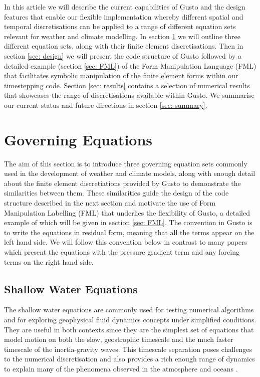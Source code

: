 \documentclass[journal abbreviation, manuscript]{copernicus}
\begin{document}
In this article we will describe the current capabilities of Gusto and
the design features that enable our flexible implementation whereby
different spatial and temporal discretisations can be applied to a
range of different equation sets relevant for weather and climate
modelling. In section \ref{sec: governing} we will outline three
different equation sets, along with their finite element
discretisations. Then in section \ref{sec: design} we will present the
code structure of Gusto followed by a detailed example (section
\ref{sec: FML}) of the Form Manipulation Language (FML) that facilitates
symbolic manipulation of the finite element forms within our
timestepping code. Section \ref{sec: results} contains a selection of
numerical results that showcases the range of discretisations
available within Gusto. We summarise our current status and future
directions in section \ref{sec: summary}.

\section{Governing Equations}
\label{sec: governing}
The aim of this section is to introduce three governing equation sets
commonly used in the development of weather and climate models, along
with enough detail about the finite element discretiations provided by
Gusto to demonstrate the similarities between them. These similarities
guide the design of the code structure described in the next section
and motivate the use of Form Manipulation Labelling (FML) that
underlies the flexibility of Gusto, a detailed example of which will
be given in section \ref{sec: FML}. The convention in Gusto is to
write the equations in residual form, meaning that all the terms
appear on the left hand side. We will follow this convention below in
contrast to many papers which present the equations with the pressure
gradient term and any forcing terms on the right hand side.

\subsection{Shallow Water Equations}
The shallow water equations are commonly used for testing numerical
algorithms and for exploring geophysical fluid dynamics concepts under
simplified conditions. They are useful in both contexts since they are
the simplest set of equations that model motion on both the slow,
geostrophic timescale and the much faster timescale of the
inertia-gravity waves. This timescale separation poses challenges to
the numerical discretisation and also provides a rich enough range of
dynamics to explain many of the phenomena observed in the atmosphere
and oceans \citep{zeitlin2018geophysical}.
\end{document}
